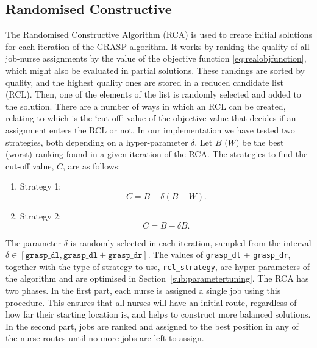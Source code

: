 \documentclass[a4paper,11pt,authoryear]{elsarticle}
\begin{document}
\subsection{Randomised Constructive}
\label{sub:randomisedconstructive}
\noindent The Randomised Constructive Algorithm (RCA) is used to create initial solutions for each iteration of the GRASP algorithm. It works by ranking the quality of all job-nurse assignments by the value of the objective function \eqref{eq:realobjfunction}, which might also be evaluated in partial solutions. These rankings are sorted by quality, and the highest quality ones are stored in a reduced candidate list (RCL). Then, one of the elements of the list is randomly selected and added to the solution. There are a number of ways in which an RCL can be created, relating to which is the `cut-off' value of the objective value that decides if an assignment enters the RCL or not. In our implementation we have tested two strategies, both depending on a hyper-parameter $\delta$. Let $B$ ($W$) be the best (worst) ranking found in a given iteration of the RCA. The strategies to find the cut-off value, $C$, are as follows:
\begin{enumerate}[label={(\arabic*)}]
     \item Strategy 1:
     \begin{equation}
         C = B + \delta (B - W). \label{eq:rcastrategy1}
     \end{equation}
     \item Strategy 2:
     \begin{equation}
         C = B - \delta B. \label{eq:rcastrategy2}
     \end{equation}
 \end{enumerate} 
The parameter $\delta$ is randomly selected in each iteration, sampled from the interval $\delta \in [\texttt{grasp\_dl}, \texttt{grasp\_dl} + \texttt{grasp\_dr}]$.
The values of \texttt{grasp\_dl} + \texttt{grasp\_dr}, together with the type of strategy to use, \texttt{rcl\_strategy}, are hyper-parameters of the algorithm and are optimised in Section~\ref{sub:parametertuning}. The RCA has two phases. In the first part, each nurse is assigned a single job using this procedure. This ensures that all nurses will have an initial route, regardless of how far their starting location is, and helps to construct more balanced solutions. In the second part, jobs are ranked and assigned to the best position in any of the nurse routes until no more jobs are left to assign. 

\end{document}
